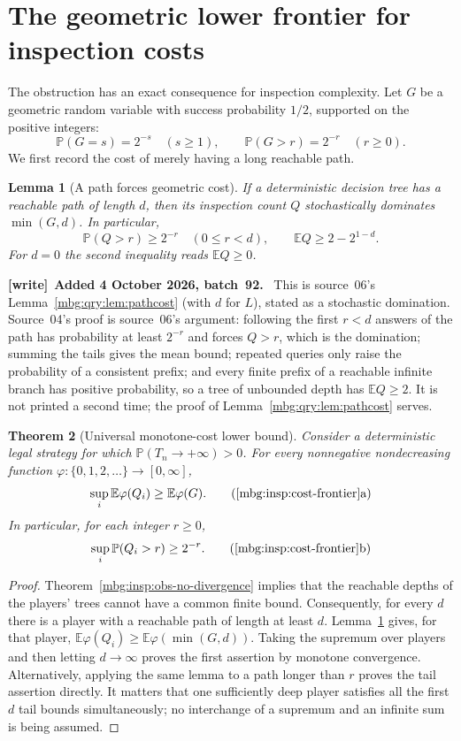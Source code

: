 \documentclass[11pt,letterpaper]{article}
\newtheorem{theorem}{Theorem}[section]
\newtheorem{lemma}[theorem]{Lemma}
\theoremstyle{definition}
\newcommand{\E}{\mathbb E}
\newcommand{\Prb}{\mathbb P}
\newenvironment{writenote}[1][]{\par\smallskip\begingroup\small
 \noindent\textbf{[write]}\if\relax\detokenize{#1}\relax\else~\textbf{#1.}\fi\ }%
 {\par\endgroup\smallskip}
\begin{document}
\section{The geometric lower frontier for inspection costs}
\label{mbg:insp:cost-section}

The obstruction has an exact consequence for inspection complexity.
Let $G$ be a geometric random variable with success probability $1/2$,
supported on the positive integers:
\[
 \Prb(G=s)=2^{-s}\quad(s\ge1),
 \qquad \Prb(G>r)=2^{-r}\quad(r\ge0).
\]
We first record the cost of merely having a long reachable path.

\begin{lemma}[A path forces geometric cost]
\label{mbg:insp:cost-path}
If a deterministic decision tree has a reachable path of length $d$,
then its inspection count $Q$ stochastically dominates $\min(G,d)$.
In particular,
\[
 \Prb(Q>r)\ge2^{-r}\quad(0\le r<d),
 \qquad \E Q\ge2-2^{1-d}.
\]
For $d=0$ the second inequality reads $\E Q\ge0$.
\end{lemma}

\begin{writenote}[Added 4 October 2026, batch~92]
This is source~06's Lemma~\ref{mbg:qry:lem:pathcost} (with $d$ for $L$), stated as a stochastic domination. Source~04's proof is source~06's argument: following the first $r<d$ answers of the path has probability at least $2^{-r}$ and forces $Q>r$, which is the domination; summing the tails gives the mean bound; repeated queries only raise the probability of a consistent prefix; and every finite prefix of a reachable infinite branch has positive probability, so a tree of unbounded depth has $\E Q\ge2$. It is not printed a second time; the proof of Lemma~\ref{mbg:qry:lem:pathcost} serves.
\end{writenote}

\begin{theorem}[Universal monotone-cost lower bound]
\label{mbg:insp:cost-frontier}
Consider a deterministic legal strategy for which
$\Prb(T_n\to+\infty)>0$.  For every nonnegative nondecreasing function
$\varphi:\{0,1,2,\ldots\}\to[0,\infty]$,
\[
 \sup_i\E\varphi(Q_i)\ge\E\varphi(G).
 \tag{\ref{mbg:insp:cost-frontier}a}
\]
In particular, for each integer $r\ge0$,
\[
 \sup_i\Prb(Q_i>r)\ge2^{-r}.
 \tag{\ref{mbg:insp:cost-frontier}b}
\]
\end{theorem}

\begin{proof}
Theorem~\ref{mbg:insp:obs-no-divergence} implies that the reachable depths of
the players' trees cannot have a common finite bound.  Consequently,
for every $d$ there is a player with a reachable path of length at least
$d$.  Lemma~\ref{mbg:insp:cost-path} gives, for that player,
$\E\varphi(Q_i)\ge\E\varphi(\min(G,d))$.
Taking the supremum over players and then letting $d\to\infty$ proves
the first assertion by monotone convergence.  Alternatively, applying
the same lemma to a path longer than $r$ proves the tail assertion
directly.  It matters that one sufficiently deep player satisfies all
the first $d$ tail bounds simultaneously; no interchange of a supremum
and an infinite sum is being assumed.
\end{proof}
\end{document}
